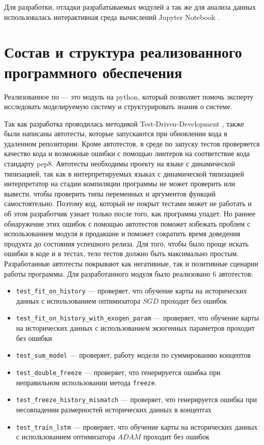 Для разработки, отладки разрабатываемых модулей а так же для
анализа данных использовалась интерактивная среда вычислений Jupyter Notebook \cite{Kluyver:2016aa}.

\section{Состав и структура реализованного программного обеспечения}

Реализованное по --- это модуль на python, который позволяет помочь эксперту
исследовать моделируемую систему и структурировать знания о системе.

Так как разработка проводилась методикой Test-Driven-Development \cite{beck2003test_tdd} \cite{janzen2005test},
также были написаны автотесты, которые запускаются
при обновлении кода в удаленном репозитории. Кроме автотестов,
в среде по запуску тестов проверяется качество кода и возможные ошибки
с помощью линтеров на соответствие кода стандарту pep8.
Автотесты необходимы проекту на языке с динамической типизацией,
так как в интерпретируемых языках с динамической типизацией
интерпретатор на стадии компиляции программы не может проверить или вывести, чтобы проверить
типы переменных и аргументов функций самостоятельно. Поэтому код, который
не покрыт тестами может не работать и об этом разработчик узнает
только после того, как программа упадет. Но раннее обнаружение этих
ошибок с помощью автотестов поможет избежать проблем с использованием модуля в
продакшне и поможет сократить время доведения продукта до состояния успешного релиза.
Для того, чтобы было проще искать ошибки в коде и в тестах,
тело тестов должно быть максимально простым.
Разработанные автотесты покрывают как негативные, так и позитивные
сценарии работы программы.
Для разработанного модуля было реализовано 6 автотестов:

\begin{itemize}
	\item \verb|test_fit_on_history| --- проверяет, что обучение карты на исторических данных с использованием оптимизатора $ SGD $ проходит без ошибок
	\item \verb|test_fit_on_history_with_exogen_param| --- проверяет, что обучение карты на исторических данных с использованием экзогенных параметров проходит без ошибки
	\item \verb|test_sum_model| --- проверяет, работу модели по суммированию концептов
	\item \verb|test_double_freeze| --- проверяет, что генерируется ошибка при неправильном использовании метода \verb|freeze|.
	\item \verb|test_freeze_history_mismatch| --- проверяет, что генерируется ошибка при несовпадении размерностей исторических данных в концептах
	\item \verb|test_train_lstm| --- проверяет, что обучение карты на исторических данных с использованием оптимизатора $ ADAM $ проходит без ошибок
\end{itemize}

